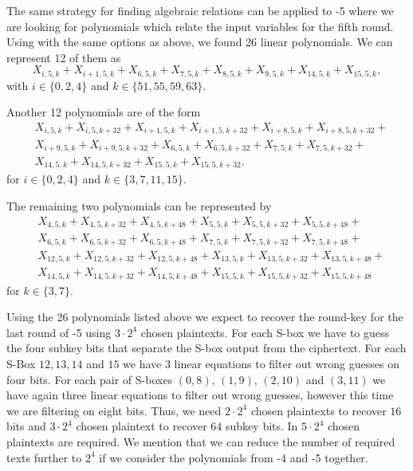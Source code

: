 The same strategy for finding algebraic relations can be applied to -5 where we are looking for polynomials which relate the input variables for the fifth round. Using \PolyBoRi with the same options as above, we found 26 linear polynomials. We can represent 12 of them as
$$
X_{i,5,k} + X_{i+1,5,k} + X_{6,5,k} + X_{7,5,k} + X_{ 8,5,k} + X_{ 9,5,k} + X_{14,5,k} + X_{15,5,k},
$$
with $i \in \{0,2,4\}$ and $k \in \{51,55,59,63\}$.

Another 12 polynomials are of the form
\begin{align*}
 & X_{i,5,k} + X_{i,5,k+32} + X_{i+1,5,k} + X_{i+1,5,k+32} + X_{i+8,5,k} + X_{i+8,5,k+32} +\\
 & X_{i+9,5,k} + X_{i+9,5,k+32} + X_{6,5,k} + X_{6,5,k+32} + X_{7,5,k} + X_{7,5,k+32} + \\
 & X_{14,5,k} + X_{14,5,k+32} + X_{15,5,k} + X_{15,5,k+32}.
\end{align*}
for $i \in \{0,2,4\}$ and $k \in \{3,7,11,15\}$.

The remaining two polynomials can be represented by
\begin{align*}
& X_{4,5,k} + X_{4,5,k+32} + X_{4,5,k+48} + X_{5,5,k} + X_{5,5,k+32} + X_{5,5,k+48} +\\
& X_{6,5,k} + X_{6,5,k+32} + X_{6,5,k+48} + X_{7,5,k} + X_{7,5,k+32} + X_{7,5,k+48} +\\
& X_{12,5,k} + X_{12,5,k+32} + X_{12,5,k+48} + X_{13,5,k} + X_{13,5,k+32} + X_{13,5,k+48} +\\
& X_{14,5,k} + X_{14,5,k+32} + X_{14,5,k+48} + X_{15,5,k} + X_{15,5,k+32} + X_{15,5,k+48}
\end{align*}
for $k \in \{3,7\}$.

Using the 26 polynomials listed above we expect to recover the round-key for the last round of -5 using $3 \cdot 2^4$ chosen plaintexts. For each S-box we have to guess the four subkey bits that separate the S-box output from the ciphertext. For each S-Box $12,13,14$ and $15$ we have $3$ linear equations to filter out wrong guesses on four bits. For each pair of S-boxes $(0,8)$, $(1,9)$, $(2,10)$ and $(3,11)$ we have again three linear equations to filter out wrong guesses, however this time we are filtering on eight bits. Thus, we need $2 \cdot 2^4$ chosen plaintexts to recover $16$ bits and $3 \cdot 2^4$ chosen plaintext to recover $64$ subkey bits. In \cite{bit-pattern-ia} $5 \cdot 2^4$ chosen plaintexts are required. We mention that we can reduce the number of required texts further to $2^4$ if we consider the polynomials from -4 and -5 together.

